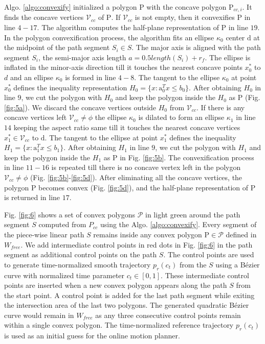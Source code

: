 Algo. \ref{algo:convexify} initialized a polygon $\mathrm{P}$ with the concave polygon $\mathrm{P}_{cc,i}$. It finds the concave vertices $\mathcal{V}_{cc}$ of $\mathrm{P}$. If $\mathcal{V}_{cc}$ is not empty, then it convexifies $\mathrm{P}$ in line $4-17$. The algorithm computes the half-plane representation of $\mathrm{P}$ in line $19$. In the polygon convexification process, the algorithm fits an ellipse $\kappa_0$ center $\mathrm{d}$ at the midpoint of the path segment $S_i\in S$. The major axis is aligned with the path segment $S_i$, the semi-major axis length $a = 0.5length(S_i) + r_f$. The ellipse is inflated in the minor-axis direction till it touches the nearest concave points $x^*_0$ to $d$ and an ellipse $\kappa_0$ is formed in line $4-8$. The tangent to the ellipse $\kappa_0$ at point $x^*_0$ defines the inequality representation $H_0 = \{x: \mathrm{a}^T_0 x \leq b_0\}$. After obtaining $H_0$ in line $9$, we cut the polygon with $H_0$ and keep the polygon inside the $H_0$ as $\mathrm{P}$ (Fig. \ref{fig:5a}). We discard the concave vertices outside $H_0$ from $\mathcal{V}_{cc}$. If there is any concave vertices left $\mathcal{V}_{cc}\neq\phi$ the ellipse $\kappa_0$ is dilated to form an ellipse $\kappa_1$ in line $14$ keeping the aspect ratio same till it touches the nearest concave vertices $x^*_1\in\mathcal{V}_{cc}$ to $\mathrm{d}$. The tangent to the ellipse at point $x^*_1$ defines the inequality $H_1 = \{x: \mathrm{a}^T_1 x \leq b_1\}$. After obtaining $H_1$ in line $9$, we cut the polygon with $H_1$ and keep the polygon inside the $H_1$ as $\mathrm{P}$ in Fig. \ref{fig:5b}. The convexification process in line $11-16$ is repeated till there is no concave vertex left in the polygon $\mathcal{V}_{cc}\neq\phi$ (Fig. \ref{fig:5b}-\ref{fig:5d}). After eliminating all the concave vertices, the polygon $\mathrm{P}$ becomes convex (Fig. \ref{fig:5d}), and the half-plane representation of $\mathrm{P}$ is returned in line $17$.

Fig. \ref{fig:6} shows a set of convex polygons $\mathcal{P}$ in light green around the path segment $S$ computed from $P_{cc}$ using the Algo. \ref{algo:convexify}. Every segment of the piece-wise linear path $S$ remains inside any convex polygon $\mathrm{P} \in \mathcal{P}$ defined in $W_{free}$. We add intermediate control points in red dots in Fig. \ref{fig:6} in the path segment as additional control points on the path $S$. The control points are used to generate time-normalized smooth trajectory $p_r(c_t)$ from the $S$ using a Bézier curve with normalized time parameter $c_t \in [0,1]$. These intermediate control points are inserted when a new convex polygon appears along the path $S$ from the start point. A control point is added for the last path segment while exiting the intersection area of the last two polygons. The generated quadratic Bézier curve would remain in $W_{free}$ as any three consecutive control points remain within a single convex polygon. The time-normalized reference trajectory $p_r(c_t)$ is used as an initial guess for the online motion planner.
 
